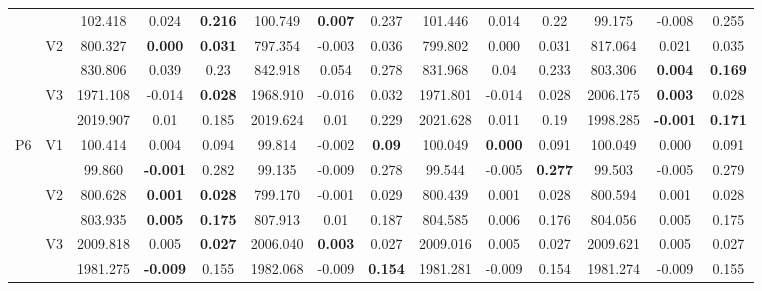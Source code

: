 \documentclass[12pt,a4paper]{article}
\begin{document}
\begin{sidewaystable}[ht]
{\begin{tabular}{cc|ccc|ccc|ccc|ccc|}
   &  & 102.418 & 0.024 & \textbf{0.216} & 100.749 & \textbf{0.007} & 0.237 & 101.446 & 0.014 & 0.22 & 99.175 & -0.008 & 0.255 \\ 
   & \multirow{2}{*}{V2} & 800.327 & \textbf{0.000} & \textbf{0.031} & 797.354 & -0.003 & 0.036 & 799.802 & 0.000 & 0.031 & 817.064 & 0.021 & 0.035 \\ 
   &  & 830.806 & 0.039 & 0.23 & 842.918 & 0.054 & 0.278 & 831.968 & 0.04 & 0.233 & 803.306 & \textbf{0.004} & \textbf{0.169} \\ 
   & \multirow{2}{*}{V3} & 1971.108 & -0.014 & \textbf{0.028} & 1968.910 & -0.016 & 0.032 & 1971.801 & -0.014 & 0.028 & 2006.175 & \textbf{0.003} & 0.028 \\ 
   &  & 2019.907 & 0.01 & 0.185 & 2019.624 & 0.01 & 0.229 & 2021.628 & 0.011 & 0.19 & 1998.285 & \textbf{-0.001} & \textbf{0.171} \\ 
   \hline \hline\multirow{6}{*}{P6} & \multirow{2}{*}{V1} & 100.414 & 0.004 & 0.094 & 99.814 & -0.002 & \textbf{0.09} & 100.049 & \textbf{0.000} & 0.091 & 100.049 & 0.000 & 0.091 \\ 
   &  & 99.860 & \textbf{-0.001} & 0.282 & 99.135 & -0.009 & 0.278 & 99.544 & -0.005 & \textbf{0.277} & 99.503 & -0.005 & 0.279 \\ 
   & \multirow{2}{*}{V2} & 800.628 & \textbf{0.001} & \textbf{0.028} & 799.170 & -0.001 & 0.029 & 800.439 & 0.001 & 0.028 & 800.594 & 0.001 & 0.028 \\ 
   &  & 803.935 & \textbf{0.005} & \textbf{0.175} & 807.913 & 0.01 & 0.187 & 804.585 & 0.006 & 0.176 & 804.056 & 0.005 & 0.175 \\ 
   & \multirow{2}{*}{V3} & 2009.818 & 0.005 & \textbf{0.027} & 2006.040 & \textbf{0.003} & 0.027 & 2009.016 & 0.005 & 0.027 & 2009.621 & 0.005 & 0.027 \\ 
   &  & 1981.275 & \textbf{-0.009} & 0.155 & 1982.068 & -0.009 & \textbf{0.154} & 1981.281 & -0.009 & 0.154 & 1981.274 & -0.009 & 0.155 \\ 
   \hline
\end{tabular}
}
\end{sidewaystable}
\end{document}

